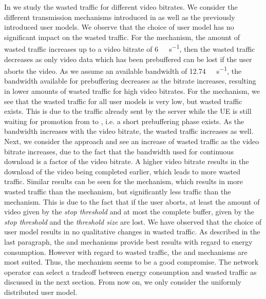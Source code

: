 In  we study the wasted traffic for different video bitrates.
We consider the different transmission mechanisms introduced in  as well as the previously introduced user models.
We observe that the choice of user model has no significant impact on the wasted traffic.
For the \download mechanism, the amount of wasted traffic increases up to a video bitrate of \SI{6}{\mega\bit\per\second}, then the wasted traffic decreases as only video data which has been prebuffered can be lost if the user aborts the video.
As we assume an available bandwidth of \SI{12.74}{\mega\bit\per\second}, the bandwidth available for prebuffering decreases as the bitrate increases, resulting in lower amounts of wasted traffic for high video bitrates.
For the \live mechanism, we see that the wasted traffic for all user models is very low, but wasted traffic exists.
This is due to the traffic already sent by the server while the \gls{UE} is still waiting for promotion from \rrcidle to \rrcconnected, i.e. a short prebuffering phase exists.
As the bandwidth increases with the video bitrate, the wasted traffic increases as well.
Next, we consider the \serviceprovisioning approach and see an increase of wasted traffic as the video bitrate increases, due to the fact that the bandwidth used for continuous download is a factor of the video bitrate.
A higher video bitrate results in the download of the video being completed earlier, which leads to more wasted traffic.
Similar results can be seen for the \streaming mechanism, which results in more wasted traffic than the \live mechanism, but significantly less traffic than the \serviceprovisioning mechanism.
This is due to the fact that if the user aborts, at least the amount of video given by the \emph{stop threshold} \bufferlower and at most the complete buffer, given by the \emph{stop threshold} and the \emph{threshold size} are lost.
We have observed that the choice of user model results in no qualitative changes in wasted traffic.
As described in the last paragraph, the \download and \streaming mechanisms provide best results with regard to energy consumption.
However with regard to wasted traffic, the \live and \streaming mechanisms are most suited.
Thus, the \streaming mechanism seems to be a good compromise.
The network operator can select a tradeoff between energy consumption and wasted traffic as discussed in the next section.
From now on, we only consider the uniformly distributed user model.

